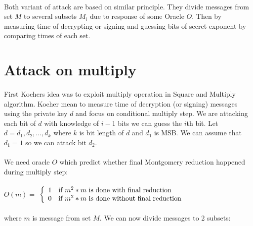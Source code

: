 \documentclass[thesis=B,english]{FITthesis}[2012/10/20]
\begin{document}
{\paragraph*{}{
Both variant of attack are based on similar principle. They divide messages from set \(M\) to several subsets \(M_i\) due to response of some Oracle \(O\). Then by measuring time of decrypting or signing and 
guessing bits of secret exponent by comparing times of each set.
}

\section{Attack on multiply}
\paragraph*{}{
First Kochers idea was to exploit multiply operation in Square and Multiply algorithm. Kocher mean to measure time of decryption (or signing) messages using the private key \(d\) 
and focus on conditional multiply step. We are attacking each bit of \(d\) with knowledge of \( i-1\) bits we can guess the \(i\)th bit. Let \(d = d_1,d_2, \ldots ,d_k \) where \(k\) is bit length of \(d\) and \(d_1\) is MSB. 
We can assume that \( d_1 = 1\) so we can attack bit \(d_2\).
}
\paragraph*{}{
We need oracle \(O\) which predict whether final Montgomery reduction happened during multiply step:
}
\paragraph*{}

\( O(m) =\) $\left\{
  \begin{array}{cl}
    \text{1} & \text{\mbox{if}  \(m^2 * m\) is done with final reduction} \\
    \text{0} & \text{\mbox{if}  \(m^2 * m\) is done without final reduction} 
  \end{array}
\right.$

\paragraph*{}
{
where \(m\) is message from set \(M\). We can now divide messages to 2 subsets:}

}
\end{document}
